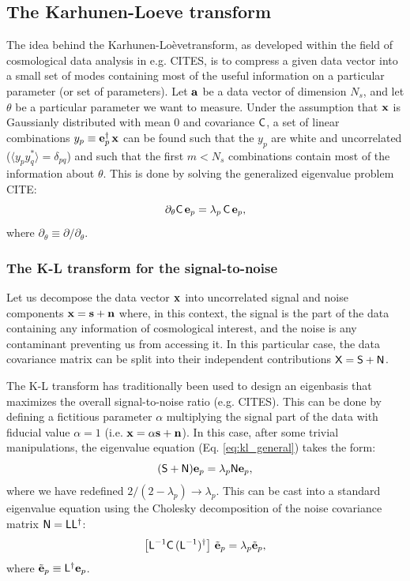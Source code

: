 \documentclass[twocolumn,amsfont,amssymb,amsmath, showpacs,balancelastpage, nofootinbib]{revtex4-1}
\newcommand{\kalo}{Karhunen-Lo\`{e}ve}
\begin{document}
  \subsection{The Karhunen-Loeve transform}\label{ssec:method.klbasis}
    The idea behind the \kalo transform, as developed within the field of cosmological data analysis in e.g. CITES, is to compress a given data vector into a small set of modes containing most of the useful information on a particular parameter (or set of parameters). Let ${\bf a}$ be a data vector of dimension $N_s$, and let $\theta$ be a particular parameter we want to measure. Under the assumption that ${\bf x}$ is Gaussianly distributed with mean 0 and covariance ${\sf C}$, a set of linear combinations $y_p\equiv{\bf e}_p^\dag\,{\bf x}$ can be found such that the $y_p$ are white and uncorrelated ($\langle y_py_q^*\rangle=\delta_{pq}$) and such that the first $m<N_s$ combinations contain most of the information about $\theta$. This is done by solving the generalized eigenvalue problem CITE:
    \begin{equation}\label{eq:kl_general}
      \partial_\theta{\sf C}\,{\bf e}_p=\lambda_p\,{\sf C}\,{\bf e}_p,
    \end{equation}
    where $\partial_\theta\equiv\partial/\partial_\theta$.
    
    \subsubsection{The K-L transform for the signal-to-noise}\label{sssec:method.klbasis.sn}
      Let us decompose the data vector ${\bf x}$ into uncorrelated signal and noise components ${\bf x}={\bf s}+{\bf n}$ where, in this context, the signal is the part of the data containing any information of cosmological interest, and the noise is any contaminant preventing us from accessing it. In this particular case, the data covariance matrix can be split into their independent contributions ${\sf X}={\sf S}+{\sf N}$.
      
      The K-L transform has traditionally been used to design an eigenbasis that maximizes the overall signal-to-noise ratio (e.g. CITES). This can be done by defining a fictitious parameter $\alpha$ multiplying the signal part of the data with fiducial value $\alpha=1$ (i.e. ${\bf x}=\alpha{\bf s}+{\bf n}$). In this case, after some trivial manipulations, the eigenvalue equation (Eq. \ref{eq:kl_general}) takes the form:
      \begin{equation}\label{eq:kl_sn}
        ({\sf S}+{\sf N}){\bf e}_p=\lambda_p{\sf N}{\bf e}_p,
      \end{equation}
      where we have redefined $2/(2-\lambda_p)\rightarrow\lambda_p$. This can be cast into a standard eigenvalue equation using the Cholesky decomposition of the noise covariance matrix ${\sf N}={\sf L}{\sf L}^\dag$:
      \begin{equation}\label{eq:kl_sn_st}
        \left[{\sf L}^{-1}{\sf C}\,({\sf L}^{-1})^\dag\right]\,\tilde{\bf e}_p=\lambda_p\tilde{\bf e}_p,
      \end{equation}
      where $\tilde{\bf e}_p\equiv{\sf L}^\dag{\bf e}_p$.
      
\end{document}
